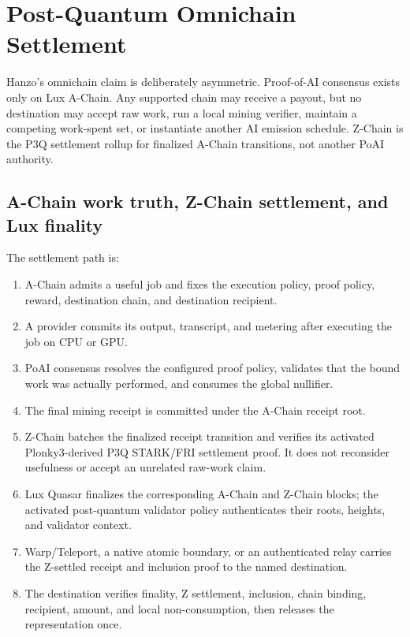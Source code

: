 \section{Post-Quantum Omnichain Settlement}
\label{sec:xchain}

Hanzo's omnichain claim is deliberately asymmetric. Proof-of-AI consensus exists
only on Lux A-Chain. Any supported chain may receive a payout, but no destination
may accept raw work, run a local mining verifier, maintain a competing work-spent
set, or instantiate another AI emission schedule. Z-Chain is the P3Q settlement
rollup for finalized A-Chain transitions, not another PoAI authority.

\subsection{A-Chain work truth, Z-Chain settlement, and Lux finality}

The settlement path is:

\begin{enumerate}[leftmargin=1.4em]
  \item A-Chain admits a useful job and fixes the execution policy, proof policy,
        reward, destination chain, and destination recipient.
  \item A provider commits its output, transcript, and metering after executing
        the job on CPU or GPU.
  \item PoAI consensus resolves the configured proof policy, validates that the
        bound work was actually performed, and consumes the global nullifier.
  \item The final mining receipt is committed under the A-Chain receipt root.
  \item Z-Chain batches the finalized receipt transition and verifies its
        activated Plonky3-derived P3Q STARK/FRI settlement proof. It does not
        reconsider usefulness or accept an unrelated raw-work claim.
  \item Lux Quasar finalizes the corresponding A-Chain and Z-Chain blocks; the
        activated post-quantum validator policy authenticates their roots,
        heights, and validator context.
  \item Warp/Teleport, a native atomic boundary, or an authenticated relay carries
        the Z-settled receipt and inclusion proof to the named destination.
  \item The destination verifies finality, Z settlement, inclusion, chain binding, recipient,
        amount, and local non-consumption, then releases the representation once.
\end{enumerate}

